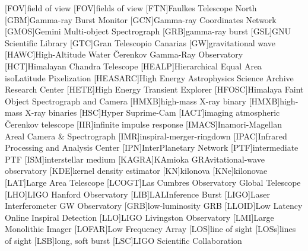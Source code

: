 \begin{acronym}
[FOV]{field of view}
[FOV]{fields of view}
[FTN]{Faulkes Telescope North}
[GBM]{Gamma-ray Burst Monitor}
[GCN]{Gamma-ray Coordinates Network}
[GMOS]{Gemini Multi-object Spectrograph}
[GRB]{gamma-ray burst}
[GSL]{GNU Scientific Library}
[GTC]{Gran Telescopio Canarias}
[GW]{gravitational wave}
[HAWC]{High\nobreakdashes-Altitude Water \v{C}erenkov Gamma\nobreakdashes-Ray Observatory}
[HCT]{Himalayan Chandra Telescope}
[HEALP]{Hierarchical Equal Area isoLatitude Pixelization}
[HEASARC]{High Energy Astrophysics Science Archive Research Center}
[HETE]{High Energy Transient Explorer}
[HFOSC]{Himalaya Faint Object Spectrograph and Camera}
[HMXB]{high\nobreakdashes-mass X\nobreakdashes-ray binary}
[HMXB]{high\nobreakdashes-mass X\nobreakdashes-ray binaries}
[HSC]{Hyper Suprime\nobreakdashes-Cam}
[IACT]{imaging atmospheric \v{C}erenkov telescope}
[IIR]{infinite impulse response}
[IMACS]{Inamori-Magellan Areal Camera \& Spectrograph}
[IMR]{inspiral-merger-ringdown}
[IPAC]{Infrared Processing and Analysis Center}
[IPN]{InterPlanetary Network}
[PTF]{intermediate \acl{PTF}}
[ISM]{interstellar medium}
[KAGRA]{KAmioka GRAvitational\nobreakdashes-wave observatory}
[KDE]{kernel density estimator}
[KN]{kilonova}
[KNe]{kilonovae}
[LAT]{Large Area Telescope}
[LCOGT]{Las Cumbres Observatory Global Telescope}
[LHO]{\ac{LIGO} Hanford Observatory}
[LIB]{LALInference Burst}
[LIGO]{Laser Interferometer \acs{GW} Observatory}
[GRB]{low\nobreakdashes-luminosity \ac{GRB}}
[LLOID]{Low Latency Online Inspiral Detection}
[LLO]{\ac{LIGO} Livingston Observatory}
[LMI]{Large Monolithic Imager}
[LOFAR]{Low Frequency Array}
[LOS]{line of sight}
[LOSs]{lines of sight}
[LSB]{long, soft burst}
[LSC]{\acs{LIGO} Scientific Collaboration}

\end{acronym}
